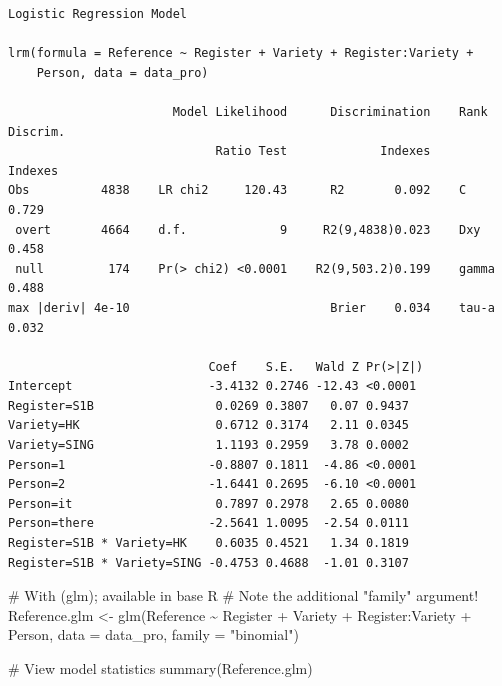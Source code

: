 \documentclass[
  11pt,
  letterpaper,
  DIV=11,
  numbers=noendperiod]{scrreprt}
\newenvironment{Shaded}{\begin{snugshade}}{\end{snugshade}}
\newcommand{\AttributeTok}[1]{\textcolor[rgb]{0.40,0.45,0.13}{#1}}
\newcommand{\CommentTok}[1]{\textcolor[rgb]{0.37,0.37,0.37}{#1}}
\newcommand{\FunctionTok}[1]{\textcolor[rgb]{0.28,0.35,0.67}{#1}}
\newcommand{\NormalTok}[1]{\textcolor[rgb]{0.00,0.23,0.31}{#1}}
\newcommand{\OtherTok}[1]{\textcolor[rgb]{0.00,0.23,0.31}{#1}}
\newcommand{\SpecialCharTok}[1]{\textcolor[rgb]{0.37,0.37,0.37}{#1}}
\newcommand{\StringTok}[1]{\textcolor[rgb]{0.13,0.47,0.30}{#1}}
\begin{document}
\begin{verbatim}
Logistic Regression Model

lrm(formula = Reference ~ Register + Variety + Register:Variety + 
    Person, data = data_pro)

                       Model Likelihood      Discrimination    Rank Discrim.    
                             Ratio Test             Indexes          Indexes    
Obs          4838    LR chi2     120.43      R2       0.092    C       0.729    
 overt       4664    d.f.             9     R2(9,4838)0.023    Dxy     0.458    
 null         174    Pr(> chi2) <0.0001    R2(9,503.2)0.199    gamma   0.488    
max |deriv| 4e-10                            Brier    0.034    tau-a   0.032    

                            Coef    S.E.   Wald Z Pr(>|Z|)
Intercept                   -3.4132 0.2746 -12.43 <0.0001 
Register=S1B                 0.0269 0.3807   0.07 0.9437  
Variety=HK                   0.6712 0.3174   2.11 0.0345  
Variety=SING                 1.1193 0.2959   3.78 0.0002  
Person=1                    -0.8807 0.1811  -4.86 <0.0001 
Person=2                    -1.6441 0.2695  -6.10 <0.0001 
Person=it                    0.7897 0.2978   2.65 0.0080  
Person=there                -2.5641 1.0095  -2.54 0.0111  
Register=S1B * Variety=HK    0.6035 0.4521   1.34 0.1819  
Register=S1B * Variety=SING -0.4753 0.4688  -1.01 0.3107  
\end{verbatim}

\begin{Shaded}
\begin{Highlighting}[]
\CommentTok{\# With (glm); available in base R}
\CommentTok{\# Note the additional "family" argument!}
\NormalTok{Reference.glm }\OtherTok{\textless{}{-}} \FunctionTok{glm}\NormalTok{(Reference }\SpecialCharTok{\textasciitilde{}}\NormalTok{ Register }\SpecialCharTok{+}\NormalTok{ Variety }\SpecialCharTok{+}\NormalTok{ Register}\SpecialCharTok{:}\NormalTok{Variety }\SpecialCharTok{+}\NormalTok{ Person, }\AttributeTok{data =}\NormalTok{ data\_pro, }\AttributeTok{family =} \StringTok{"binomial"}\NormalTok{)}

\CommentTok{\# View model statistics}
\FunctionTok{summary}\NormalTok{(Reference.glm)}
\end{Highlighting}
\end{Shaded}
\end{document}
